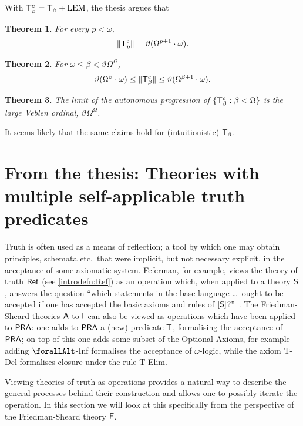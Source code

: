 \documentclass[UKenglish,cleveref,DIV=12]{scrartcl}
\let\forall\forallAlt
\newtheorem{theorem}{Theorem}
\theoremstyle{definition}
\theoremstyle{definition}
\begin{document}
With \( \mathsf{T}^c_\beta = \mathsf{T}_\beta + \textrm{LEM} \), the thesis argues that
%
\begin{theorem}
	For every \( p < \omega \),
\[
  \lVert{\mathsf{T}^c_p}\rVert = \vartheta ( \Omega ^{p+1} \cdot \omega ).
\]
\end{theorem}

\begin{theorem}
	For \( \omega \le \beta < \vartheta \Omega^\Omega \),
\[
	\vartheta(\Omega^\beta \cdot \omega) \le \lVert{\mathsf{T}^c_\beta}\rVert \le \vartheta ( \Omega ^{\beta+1} \cdot \omega ).
\]
\end{theorem}

\begin{theorem}
	The limit of the autonomous progression of \( \{ \mathsf{T}^c_\beta : \beta < \Omega \} \) is the large Veblen ordinal, \( \vartheta \Omega^\Omega \).
\end{theorem}

It seems likely that the same claims hold for (intuitionistic) \( \mathsf{T}_\beta \).

\section{From the thesis: Theories with multiple self-applicable truth predicates}
\label{chap:ext}

\fussy Truth is often used as a means of reflection; a tool by which one may obtain
principles, schemata etc.~that were implicit, but not necessary explicit, in the
acceptance of some axiomatic system. Feferman, for example, views the theory
of truth $\mathsf{Ref}$ (see \cref{introdefn:Ref}) as an operation which, when applied
to a theory $\mathsf{S}$, answers the question ``which statements in the base
language \dots{}\ {ought} to be accepted {if} one has accepted the basic axioms and
rules of $[\mathsf{S}]$?''~\cite[p.~2]{Fef91}.
The Friedman-Sheard theories $\mathsf{A}$ to $\mathsf{I}$ can also be viewed as operations which
have been applied to $\mathsf{PRA}$: one adds to $\mathsf{PRA}$ a (new) predicate $\mathsf{T}$,
formalising the acceptance of $\mathsf{PRA}$; on top of this one adds some subset of the Optional
Axioms, for example adding $\forall$-Inf formalises the acceptance of
$\omega$-logic, while the axiom T-Del formalises closure under the rule T-Elim.

Viewing theories of truth as operations provides a natural way to describe the
general processes behind their construction and allows one to possibly iterate
the operation. In this section we will look at this specifically from the
perspective of the Friedman-Sheard theory $\mathsf{F}$.%
\end{document}
